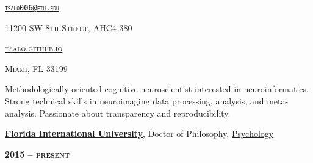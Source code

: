 \documentclass[10pt]{article}
\date{}
\newcommand{\namestyle}{\Huge \fontfamily{pcr}\selectfont}
\newcommand{\iconstyle}{\LARGE}
\newcommand{\headstyle}{\scshape \normalsize \textcolor{light-gray}}
\newcommand{\sectionstyle}{\LARGE \fontfamily{pcr}\selectfont}
\begin{document}
\begin{center}
	\namestyle{TAYLOR SALO}

	\bigskip

	\iconstyle{\href{https://github.com/tsalo}{\faGithubSquare}}
	\enspace
	\iconstyle{\href{https://www.researchgate.net/profile/Taylor_Salo}{}}
	\enspace
	\iconstyle{\href{https://scholar.google.com/citations?user=YbH1akIAAAAJ}{}}
	\enspace
	\iconstyle{\href{https://osf.io/iwpvm/}{}}
\end{center}

\begin{minipage}[t]{.5\linewidth}
\flushleft
\headstyle{\href{mailto:tsalo006@fiu.edu}{\nolinkurl{tsalo006@fiu.edu}}}
\end{minipage}
\hfill
\begin{minipage}[t]{.5\linewidth}
\flushright
\headstyle{11200 SW 8th Street, AHC4 380}
\end{minipage}

\begin{minipage}[t]{.3\linewidth}
\flushleft
\headstyle{\href{https://tsalo.github.io}{tsalo.github.io}}
\end{minipage}
\hfill
\begin{minipage}[t]{.7\linewidth}
\flushright
\headstyle{Miami, FL 33199}
\end{minipage}

\bigskip

\begin{center}\sectionstyle{PROFILE}\end{center}

Methodologically-oriented cognitive neuroscientist interested in
neuroinformatics. Strong technical skills in neuroimaging data
processing, analysis, and meta-analysis. Passionate about transparency
and reproducibility.

\bigskip

\begin{center}\sectionstyle{EDUCATION}\end{center}

\begin{minipage}[t]{.7\linewidth}
\flushleft
\noindent
\href{https://fiu.edu}{\textbf{Florida International University}},
Doctor of Philosophy,
\href{https://psychology.fiu.edu}{Psychology}
\end{minipage}
\hfill
\begin{minipage}[t]{.3\linewidth}
\flushright
\noindent
\textsc{\textbf{2015 -- present}}
\end{minipage}
\end{document}
